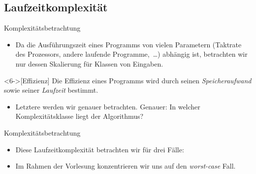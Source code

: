 \subsection{Laufzeitkomplexität}
\begin{frame}{Komplexitätsbetrachtung}
    \begin{itemize}[<+(1)->]
        \widei
        \item Da die Ausführungszeit eines Programms\pause{} von vielen Parametern\pause{} (Taktrate des Prozessors, andere laufende Programme,~\ldots) abhängig ist,\pause{} betrachten wir nur dessen Skalierung für Klassen von Eingaben.
    \end{itemize}
    \begin{definition}<6->[Effizienz]
        \pause{}Die Effizienz eines Programms wird durch seinen \emph{Speicheraufwand} sowie seiner \emph{Laufzeit} bestimmt.
    \end{definition}
    \begin{itemize}[<+(1)->]
        \widei
        \item<8-> Letztere werden wir genauer betrachten. Genauer: In welcher Komplexitätsklasse liegt der Algorithmus?
    \end{itemize}
\end{frame}

\begin{frame}{Komplexitätsbetrachtung}
    \begin{itemize}[<+(1)->]
        \widei
        \item Diese Laufzeitkomplexität betrachten wir für drei Fälle: 
        \item Im Rahmen der Vorlesung konzentrieren wir uns auf den \emph{worst-case} Fall.
    \end{itemize}
\end{frame}

